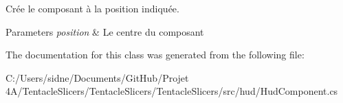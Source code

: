 Crée le composant à la position indiquée. 


\begin{DoxyParams}{Parameters}
{\em position} & Le centre du composant \\
\hline
\end{DoxyParams}


The documentation for this class was generated from the following file\+:\begin{DoxyCompactItemize}
\item 
C\+:/\+Users/sidne/\+Documents/\+Git\+Hub/\+Projet 4\+A/\+Tentacle\+Slicers/\+Tentacle\+Slicers/\+Tentacle\+Slicers/src/hud/Hud\+Component.\+cs\end{DoxyCompactItemize}
